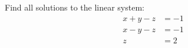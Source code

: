 Find all solutions to the linear system:
\begin{align*}
x + y - z &= -1\\
x - y - z &= -1\\
z &= 2
\end{align*}